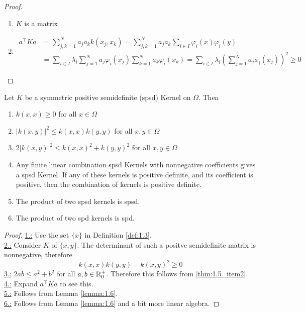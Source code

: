 \begin{proof}
    \begin{enumerate}
        \item $K$ is a  matrix
        \item \begin{align*}
            a^\intercal K a&=\sum_{j,k=1}^N a_ja_k k(x_j,x_k)=\sum_{j,k=1}^Na_ja_k\sum_{i\in I}\varphi_i(x)\varphi_i(y)\\
            &=\sum_{i\in I}\lambda_i\sum_{j=1}^N a_j\varphi_i(x_j)\sum_{k=1}^N a_k\varphi_i(x_k)=\sum_{i\in I}\lambda_i\left(\sum_{j=1}^N a_j\phi_i(x_j)\right)^2\geq 0
        \end{align*}
    \end{enumerate}
\end{proof}

\begin{theorem}\label{thm:1.5}
    Let $K$ be a symmetric positive semidefinite (spsd) Kernel on $\Omega$. Then  
    \begin{enumerate}
        \item $k(x,x)\geq 0$ for all $x\in \Omega$
        \item\label{thm:1.5_item2} $\vert k(x,y)\vert^2\leq k(x,x)k(y,y)$ for all $x,y\in\Omega$
        \item $2\vert k(x,y)\vert^2\leq k(x,x)^2+k(y,y)^2$ for all $x,y\in\Omega$
        \item Any finite linear combination spsd Kernels with nonnegative coefficients gives a spsd Kernel. If any of these kernels is positive definite, and its coefficient is positive, then the combination of kernels is positive definite.
        \item The product of two spsd kernels is spsd.
        \item The product of two spd kernels is spd.
    \end{enumerate}
\end{theorem}

\begin{proof}
    \underline{1.:} Use the set $\{x\}$ in Definition \ref{def:1.3}.\\
    \underline{2.:} Consider $K$ of $\{x,y\}$. 
    The determinant of such a positve semidefinite matrix is nonnegative,
    therefore \[k(x,x)k(y,y)-k(x,y)^2\geq 0\]
    \underline{3.:} $2ab\leq a^2+b^2$ for all $a,b\in\mathbb{R}_0^+$. Therefore this follows from \ref{thm:1.5_item2}.\\
    \underline{4.:} Expand $a^\intercal K a$ to see this.\\
    \underline{5.:} Follows from Lemma \ref{lemma:1.6}.\\
    \underline{6.:} Follows from Lemma \ref{lemma:1.6} and a bit more linear algebra.
\end{proof}

